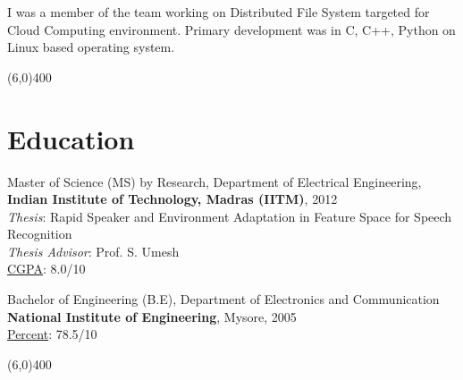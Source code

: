 \documentclass[line,margin]{res}
\begin{document}
\begin{resume}
\small
I was a member of the team working on Distributed File System targeted for Cloud Computing environment. Primary development was in C, C++, Python on Linux based operating system. 
 
\normalsize
\vspace{-5mm}
\line(6,0){400}



\section{Education} 
\small
Master of Science (MS) by Research, Department of Electrical Engineering, \\{\bf Indian Institute of Technology, Madras (IITM)}, 2012  \\
\emph{Thesis}: Rapid Speaker and Environment Adaptation in Feature Space for Speech Recognition \\
\emph{Thesis Advisor}: Prof. S. Umesh \\
\underline {CGPA}: 8.0/10 

Bachelor of Engineering (B.E), Department of Electronics and Communication \\ {\bf National Institute of Engineering}, Mysore, 2005 \\
\underline {Percent}: 78.5/10 

\line(6,0){400}


\end{resume}
\end{document}
